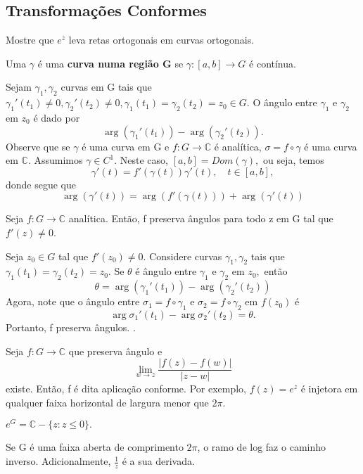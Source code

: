 \documentclass[complex.tex]{subfiles}
\begin{document}
\subsection{Transformações Conformes}
\begin{exer*}
	Mostre que $e^{z}$ leva retas ortogonais em curvas ortogonais.
\end{exer*}
\begin{def*}
	Uma $\gamma$ é uma \textbf{curva numa região G} se $\gamma:[a, b]\rightarrow G$ é contínua.
\end{def*}
Sejam $\gamma _{1}, \gamma_2$ curvas em G tais que $\gamma_1'(t_1)\neq{0}, \gamma_2'(t_2)\neq{0}, \gamma_1(t_1) = \gamma_2(t_2) = z_{0}\in{G}.$
O ângulo entre $\gamma _{1}\text{ e }\gamma_2$ em $z_{0}$ é dado por
$$
	\arg(\gamma_1'(t_1)) - \arg(\gamma_2'(t_2)).
$$
Observe que se $\gamma$ é uma curva em G e $f:G\rightarrow \mathbb{C}$ é analítica,
$\sigma = f\circ\gamma$ é uma curva em $\mathbb{C}.$ Assumimos $\gamma\in{C^1}.$ Neste
caso, $[a, b] = Dom(\gamma),$ ou seja, temos
$$
	\gamma'(t) = f'(\gamma(t))\gamma'(t), \quad t\in{[a, b]},
$$
donde segue que
$$
	\arg(\gamma'(t)) = \arg(f'(\gamma(t))) + \arg(\gamma'(t))
$$
\begin{theorem*}
	Seja $f:G\rightarrow \mathbb{C}$ analítica. Então, f preserva ângulos para todo
	z em G tal que $f'(z)\neq{0}$.
\end{theorem*}
\begin{proof*}
	Seja $z_{0}\in{G}$ tal que $f'(z_{0})\neq{0}$. Considere curvas $\gamma_1, \gamma_2$
	tais que $\gamma_1(t_1) = \gamma_2(t_2) = z_{0}.$ Se $\theta$ é ângulo entre $\gamma_1\text{ e }\gamma_2\text{ em }z_{0},$
	então
	$$
		\theta = \arg(\gamma_1'(t_1)) - \arg(\gamma_2'(t_2))
	$$
	Agora, note que o ângulo entre $\sigma_1 = f\circ{\gamma_1}$ e $\sigma_2 = f\circ{\gamma_2}$ em
	$f(z_{0})$ é
	$$
		\arg \sigma_1'(t_1) - \arg \sigma_2'(t_2) = \theta.
	$$
	Portanto, f preserva ângulos. \qedsymbol.
\end{proof*}
Seja $f:G\rightarrow \mathbb{C}$ que preserva ângulo e
$$
	\lim_{w\to{z}} \frac{|f(z) - f(w)|}{|z-w|}
$$
existe. Então, f é dita aplicação conforme. Por exemplo, $f(z) = e^z$ é injetora
em qualquer faixa horizontal de largura menor que $2\pi.$
\begin{crl*}
	$e ^{G} = \mathbb{C} - \{z: z\leq{0}\}.$
\end{crl*}
Se G é uma faixa aberta de comprimento $2\pi$, o ramo de log faz o caminho inverso. Adicionalmente,
$\frac{1}{z}$ é a sua derivada.
\end{document}
